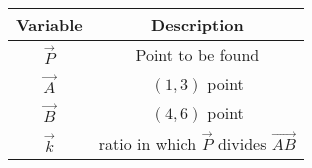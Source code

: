 \begin{tabular}[12pt]{ |c| c|}
    \hline
    \textbf{Variable} & \textbf{Description}\\ 
    \hline
	$\vec{P}$ & Point to be found\\
    \hline
	$\vec{A}$ & $(1,3)$ point\\
    \hline
	$\vec{B}$ & $(4,6)$ point\\
    \hline
	$\vec{k}$ & ratio in which $\vec{P}$ divides $\vec{AB}$\\
    \hline
    \end{tabular}
